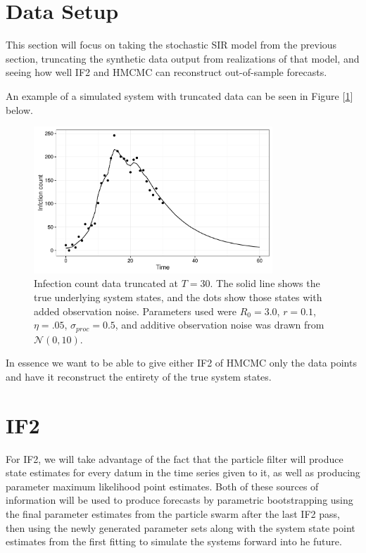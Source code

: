 
\section{Data Setup}

	This section will focus on taking the stochastic SIR model from the previous section, truncating the synthetic data output from realizations of that model, and seeing how well IF2 and HMCMC can reconstruct out-of-sample forecasts.

	An example of a simulated system with truncated data can be seen in Figure [\ref{dataplot}] below.

	\begin{figure}[H]
        \centering
        \captionsetup{width=.8\linewidth}
        \includegraphics[width=0.8\textwidth]{./images/dataplot.pdf}
        \caption{Infection count data truncated at $T = 30$. The solid line shows the true underlying system states, and the dots show those states with added observation noise. Parameters used were $R_0 = 3.0$, $r = 0.1$, $\eta = .05$, $\sigma_{proc} = 0.5$, and additive observation noise was drawn from $\mathcal{N}(0,10)$.}
        \label{dataplot}
    \end{figure}

	In essence we want to be able to give either IF2 of HMCMC only the data points and have it reconstruct the entirety of the true system states.
    

\section{IF2}

	For IF2, we will take advantage of the fact that the particle filter will produce state estimates for every datum in the time series given to it, as well as producing parameter maximum likelihood point estimates. Both of these sources of information will be used to produce forecasts by parametric bootstrapping using the final parameter estimates from the particle swarm after the last IF2 pass, then using the newly generated parameter sets along with the system state point estimates from the first fitting to simulate the systems forward into he future.

